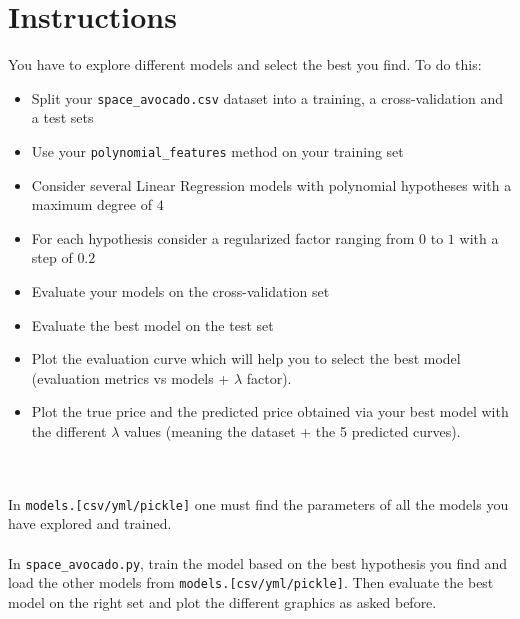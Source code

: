 \section*{Instructions}
You have to explore different models and select the best you find.
To do this:\\
\begin{itemize}
  \item Split your \texttt{space\_avocado.csv} dataset into a training, a cross-validation and a test sets
  \item Use your \texttt{polynomial\_features} method on your training set
  \item Consider several Linear Regression models with polynomial hypotheses with a maximum degree of $4$
  \item For each hypothesis consider a regularized factor ranging from $0$ to $1$ with a step of $0.2$
  \item Evaluate your models on the cross-validation set
  \item Evaluate the best model on the test set
\end{itemize}
\begin{itemize}
  \item Plot the evaluation curve which will help you to select the best model 
  (evaluation metrics vs models + $\lambda$ factor).
  \item Plot the true price and the predicted price obtained via your best model
   with the different $\lambda$ values (meaning the dataset + the 5 predicted curves).
\end{itemize}

\\
\\
In \texttt{models.[csv/yml/pickle]} one must find the parameters of all the models 
you have explored and trained.\\
\\
In \texttt{space\_avocado.py}, train the model based on the best hypothesis you find 
and load the other models from \texttt{models.[csv/yml/pickle]}.
Then evaluate the best model on the right set and plot the different graphics as asked before.
